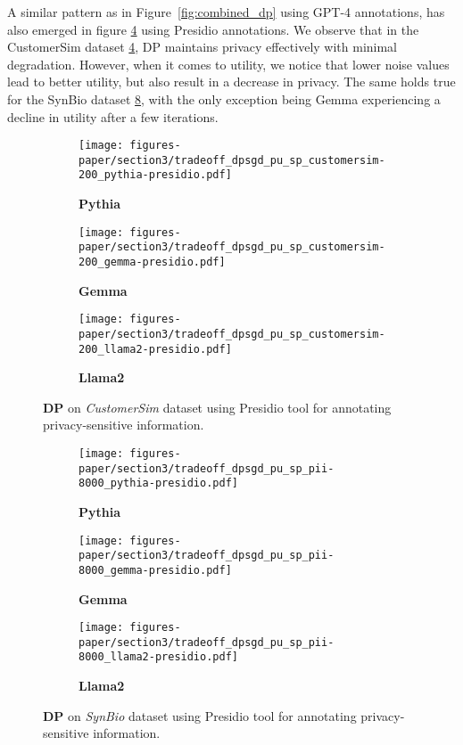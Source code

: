 A similar pattern as in Figure~\ref{fig:combined_dp} using GPT-4 annotations, has also emerged in figure \ref{fig:appendix-dp-csim} using Presidio annotations. We observe that in the CustomerSim dataset \ref{fig:appendix-dp-csim}, DP maintains privacy effectively with minimal degradation. However, when it comes to utility, we notice that lower noise values lead to better utility, but also result in a decrease in privacy. 
The same holds true for the SynBio dataset \ref{fig:appendix-dp-pii}, with the only exception being Gemma experiencing a decline in utility after a few iterations.
\begin{figure}[!h]
    \centering
    \begin{subfigure}{.48\linewidth}
        \texttt{[image: figures-paper/section3/tradeoff\_dpsgd\_pu\_sp\_customersim-200\_pythia-presidio.pdf]}
        \caption{\textbf{Pythia}}
        \label{fig:appendix-dp_csima}
    \end{subfigure}
    \begin{subfigure}{.48\linewidth}
        \texttt{[image: figures-paper/section3/tradeoff\_dpsgd\_pu\_sp\_customersim-200\_gemma-presidio.pdf]}
        \caption{\textbf{Gemma}}
        \label{fig:appendix-dp_csimb}
    \end{subfigure}
    \begin{subfigure}{.48\linewidth}
        \texttt{[image: figures-paper/section3/tradeoff\_dpsgd\_pu\_sp\_customersim-200\_llama2-presidio.pdf]}
        \caption{\textbf{Llama2}}
        \label{fig:appendix-dp_csimc}
    \end{subfigure}
    \caption{\textbf{DP} on \emph{CustomerSim} dataset using Presidio tool for annotating privacy-sensitive information.}
    \label{fig:appendix-dp-csim}
\end{figure}


\begin{figure}[!h]
    \centering
    \begin{subfigure}{0.48\linewidth}
    \centering
    \texttt{[image: figures-paper/section3/tradeoff\_dpsgd\_pu\_sp\_pii-8000\_pythia-presidio.pdf]}
    \caption{\textbf{Pythia}}
    \label{fig:appendix-dp_piia}
    \end{subfigure}
    \begin{subfigure}{0.48\linewidth}
    \centering
    \texttt{[image: figures-paper/section3/tradeoff\_dpsgd\_pu\_sp\_pii-8000\_gemma-presidio.pdf]}
    \caption{\textbf{Gemma}}
    \label{fig:appendix-dp_piib}
    \end{subfigure}
    \begin{subfigure}{0.48\linewidth}
    \centering
    \texttt{[image: figures-paper/section3/tradeoff\_dpsgd\_pu\_sp\_pii-8000\_llama2-presidio.pdf]}
    \caption{\textbf{Llama2}}
    \label{fig:appendix-dp_piic}
    \end{subfigure}
    \caption{\textbf{DP} on \emph{SynBio} dataset using Presidio tool for annotating privacy-sensitive information.}
    \label{fig:appendix-dp-pii}
\end{figure}

